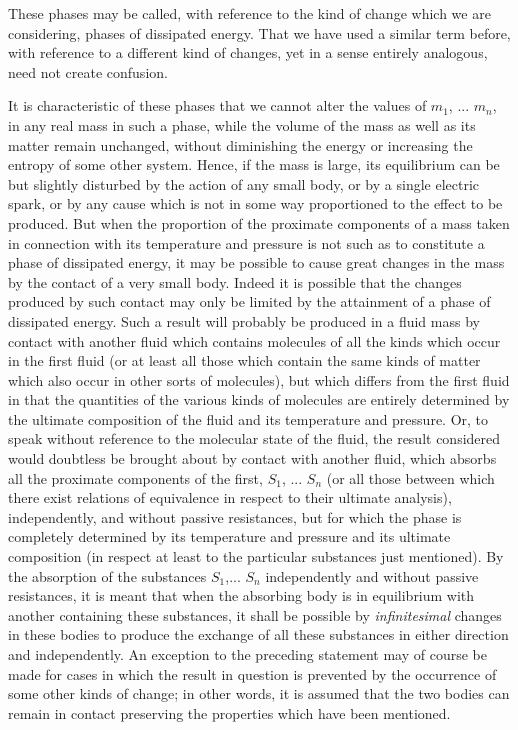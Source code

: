 \documentclass[12pt]{article}
\begin{document}
These phases may be called, with reference to the kind of change which we are considering, phases of dissipated energy. That we have used a similar term before, with reference to a different kind of changes, yet in a sense entirely analogous, need not create confusion.


It is characteristic of these phases that we cannot alter the values of $m_1$, ... $m_n$, in any real mass in such a phase, while the volume of the mass as well as its matter remain unchanged, without diminishing the energy or increasing the entropy of some other system. Hence, if the mass is large, its equilibrium can be but slightly disturbed
by the action of any small body, or by a single electric spark, or by any cause which is not in some way proportioned to the effect to be produced. But when the proportion of the proximate components of a mass taken in connection with its temperature and pressure is not such as to constitute a phase of dissipated energy, it may be possible to cause great changes in the mass by the contact of a very small body. 
Indeed it is possible that the changes produced by such contact may only be limited by the attainment of a phase of dissipated energy. Such a result will probably be produced in a fluid mass by contact with another fluid which contains molecules of all the kinds which occur in the first fluid (or at least all those which contain the same kinds of matter which also occur in other sorts of molecules), but which differs from the first fluid in that the quantities of the various kinds of molecules are entirely determined by the ultimate composition of the fluid and its temperature and pressure. Or, to speak without reference to the molecular state of the fluid, the result considered would doubtless be brought about by contact with another fluid, which absorbs all the proximate components of the first, $S_1$, ... $S_n$  (or all those between which there exist relations of equivalence in respect to their ultimate analysis), independently, and without passive resistances, but for which the phase is completely determined by its temperature and pressure and its ultimate composition (in respect at least to the particular substances just mentioned). By the absorption of the substances $S_1$,... $S_n$ independently and without passive resistances, it is meant that when the absorbing body is in equilibrium with another containing these substances, it shall be possible by \textit{infinitesimal} changes in these bodies to produce the exchange of all these substances in either direction and independently. An exception to the preceding statement may of course be made for cases in which the result in question is prevented by the occurrence of some other kinds of change; in other words, it is assumed that the two bodies can remain in contact preserving the properties which have been mentioned.
\end{document}
